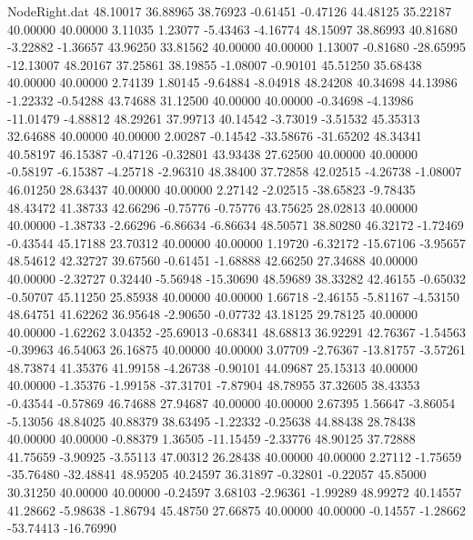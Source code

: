 \begin{filecontents}{NodeRight.dat}
  48.10017   36.88965   38.76923    -0.61451   -0.47126   44.48125   35.22187   40.00000   40.00000    3.11035    1.23077   -5.43463   -4.16774
  48.15097   38.86993   40.81680    -3.22882   -1.36657   43.96250   33.81562   40.00000   40.00000    1.13007   -0.81680  -28.65995  -12.13007
  48.20167   37.25861   38.19855    -1.08007   -0.90101   45.51250   35.68438   40.00000   40.00000    2.74139    1.80145   -9.64884   -8.04918
  48.24208   40.34698   44.13986    -1.22332   -0.54288   43.74688   31.12500   40.00000   40.00000   -0.34698   -4.13986  -11.01479   -4.88812
  48.29261   37.99713   40.14542    -3.73019   -3.51532   45.35313   32.64688   40.00000   40.00000    2.00287   -0.14542  -33.58676  -31.65202
  48.34341   40.58197   46.15387    -0.47126   -0.32801   43.93438   27.62500   40.00000   40.00000   -0.58197   -6.15387   -4.25718   -2.96310
  48.38400   37.72858   42.02515    -4.26738   -1.08007   46.01250   28.63437   40.00000   40.00000    2.27142   -2.02515  -38.65823   -9.78435
  48.43472   41.38733   42.66296    -0.75776   -0.75776   43.75625   28.02813   40.00000   40.00000   -1.38733   -2.66296   -6.86634   -6.86634
  48.50571   38.80280   46.32172    -1.72469   -0.43544   45.17188   23.70312   40.00000   40.00000    1.19720   -6.32172  -15.67106   -3.95657
  48.54612   42.32727   39.67560    -0.61451   -1.68888   42.66250   27.34688   40.00000   40.00000   -2.32727    0.32440   -5.56948  -15.30690
  48.59689   38.33282   42.46155    -0.65032   -0.50707   45.11250   25.85938   40.00000   40.00000    1.66718   -2.46155   -5.81167   -4.53150
  48.64751   41.62262   36.95648    -2.90650   -0.07732   43.18125   29.78125   40.00000   40.00000   -1.62262    3.04352  -25.69013   -0.68341
  48.68813   36.92291   42.76367    -1.54563   -0.39963   46.54063   26.16875   40.00000   40.00000    3.07709   -2.76367  -13.81757   -3.57261
  48.73874   41.35376   41.99158    -4.26738   -0.90101   44.09687   25.15313   40.00000   40.00000   -1.35376   -1.99158  -37.31701   -7.87904
  48.78955   37.32605   38.43353    -0.43544   -0.57869   46.74688   27.94687   40.00000   40.00000    2.67395    1.56647   -3.86054   -5.13056
  48.84025   40.88379   38.63495    -1.22332   -0.25638   44.88438   28.78438   40.00000   40.00000   -0.88379    1.36505  -11.15459   -2.33776
  48.90125   37.72888   41.75659    -3.90925   -3.55113   47.00312   26.28438   40.00000   40.00000    2.27112   -1.75659  -35.76480  -32.48841
  48.95205   40.24597   36.31897    -0.32801   -0.22057   45.85000   30.31250   40.00000   40.00000   -0.24597    3.68103   -2.96361   -1.99289
  48.99272   40.14557   41.28662    -5.98638   -1.86794   45.48750   27.66875   40.00000   40.00000   -0.14557   -1.28662  -53.74413  -16.76990

\end{filecontents}
